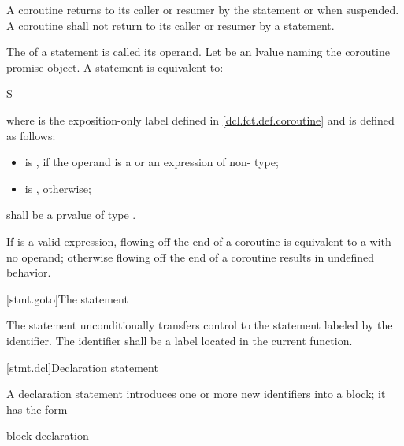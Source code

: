 \pnum
A coroutine returns to its caller or resumer
by the  statement or when suspended.
A coroutine shall not return to its caller or resumer
by a  statement.

\pnum
The  of a  statement is
called its operand.
Let  be an lvalue naming the coroutine
promise object.
A  statement is equivalent to:
\begin{ncsimplebnf}
\terminal{\{} S\terminal{;}  \terminal{;} \terminal{\}}
\end{ncsimplebnf}
where  is the exposition-only label
defined in \ref{dcl.fct.def.coroutine}
and  is defined as follows:
\begin{itemize}
\item
{} is \tcode{)},
if the operand is a  or an expression of non- type;

\item
{} is \tcode{\{}{ } \tcode{;} \tcode{;{ }\}}, otherwise;
\end{itemize}

 shall be a prvalue of type .

\pnum
If  is a valid expression,
flowing off the end of a coroutine is equivalent to a  with no operand;
otherwise flowing off the end of a coroutine results in undefined behavior.

[stmt.goto]{The  statement}%

\pnum
The  statement unconditionally transfers control to the
statement labeled by the identifier. The identifier shall be a
%
label located in the current function.

[stmt.dcl]{Declaration statement}%

\pnum
A declaration statement introduces one or more new identifiers into a
block; it has the form
\begin{bnf}
\br
    block-declaration
\end{bnf}

